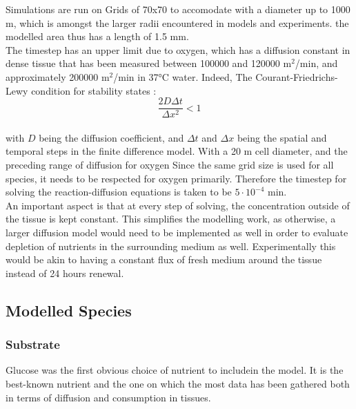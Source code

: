 \documentclass[11pt,a4paper]{article}
\begin{document}
Simulations are run on Grids of 70x70 to accomodate with a diameter up to 1000 \textmu m, which is amongst the larger radii encountered in models and experiments.\cite{Mao2018}\cite{Freyer1986}\cite{MullerKlieser1986} the modelled area thus has a length of 1.5 mm.\\

The timestep has an upper limit due to oxygen, which has a diffusion constant in dense tissue that has been measured between 100000 and 120000 \textmu m$^2$/min,\cite{Mao2018}\cite{Casciari1992} and approximately 200000 \textmu m$^{2}$/min in 37°C water.\cite{Wise1966}\cite{Macdougall1967} Indeed, The Courant-Friedrichs-Lewy condition for stability states :\\

\[ \frac{2 D \Delta t}{\Delta x^2} < 1 \] \\

with $D$ being the diffusion coefficient, and $\Delta t$ and $\Delta x$ being the spatial and temporal steps in the finite difference model. With a 20 \textmu m cell diameter, and the preceding range of diffusion for oxygen Since the same grid size is used for all species, it needs to be respected for oxygen primarily. Therefore the timestep for solving the reaction-diffusion equations is taken to be $5 \cdot 10^{-4}$ min.\\

An important aspect is that at every step of solving, the concentration outside of the tissue is kept constant. This simplifies the modelling work, as otherwise, a larger diffusion model would need to be implemented as well in order to evaluate depletion of nutrients in the surrounding medium as well. Experimentally this would be akin to having a constant flux of fresh medium around the tissue instead of 24 hours renewal.\\
 
\subsection{Modelled Species}


\subsubsection{Substrate}
Glucose was the first obvious choice of nutrient to includein the model. It is the best-known nutrient and the one on which the most data has been gathered both in terms of diffusion and consumption in tissues.\\
\end{document}
